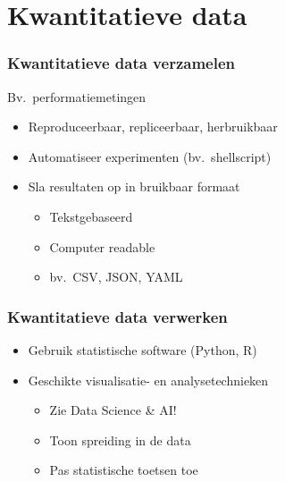 \documentclass[aspectratio=169]{beamer}
\begin{document}
\section{Kwantitatieve data}

\begin{frame}
  \frametitle{Kwantitatieve data verzamelen}

  Bv.\ performatiemetingen

  \begin{itemize}
    \item Reproduceerbaar, repliceerbaar, herbruikbaar
    \item Automatiseer experimenten (bv.\ shellscript)
    \item Sla resultaten op in bruikbaar formaat
          \begin{itemize}
            \item Tekstgebaseerd
            \item Computer readable
            \item bv.\ CSV, JSON, YAML
          \end{itemize}
  \end{itemize}

\end{frame}

\begin{frame}
  \frametitle{Kwantitatieve data verwerken}

  \begin{itemize}
    \item Gebruik statistische software (Python, R)
    \item Geschikte visualisatie- en analysetechnieken
          \begin{itemize}
            \item Zie Data Science \& AI!
            \item Toon spreiding in de data
            \item Pas statistische toetsen toe
          \end{itemize}
  \end{itemize}

\end{frame}
\end{document}
